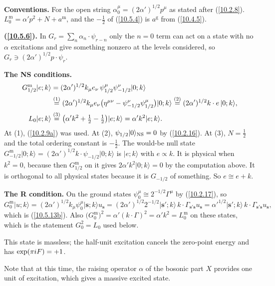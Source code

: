 	\begin{tcolorbox}[breakable]
		\begin{remark}
			\textbf{Conventions.} For the open string $\alpha^\mu_0=(2\alpha')^{1/2}p^\mu$ as stated after (\ref{10.2.8}). $L^{\mathrm m}_0=\alpha'p^{2}+N+a^{\mathrm m}$, and the $-\tfrac12$ of (\ref{10.5.4}) is $a^{\mathrm g}$ from (\ref{10.4.5}).

			\textbf{(\ref{10.5.6}).} In $G_r=\sum_n\alpha_n\cdot\psi_{r-n}$ only the $n=0$ term can act on a state with no $\alpha$ excitations and give something nonzero at the levels considered, so $G_r\ni(2\alpha')^{1/2}p\cdot\psi_r$.

			\textbf{The NS conditions.}
			\begin{align*}
				G^{\mathrm m}_{1/2}\lvert e;k\rangle&=(2\alpha')^{1/2}k_\mu e_\nu\,\psi^\mu_{1/2}\psi^\nu_{-1/2}\lvert0;k\rangle\\
				&\overset{(1)}{=}(2\alpha')^{1/2}k_\mu e_\nu\bigl(\eta^{\mu\nu}-\psi^\nu_{-1/2}\psi^\mu_{1/2}\bigr)\lvert0;k\rangle
				\overset{(2)}{=}(2\alpha')^{1/2}k\cdot e\,\lvert0;k\rangle,\\
				L_0\lvert e;k\rangle&\overset{(3)}{=}\bigl(\alpha'k^{2}+\tfrac12-\tfrac12\bigr)\lvert e;k\rangle=\alpha'k^{2}\lvert e;k\rangle .
			\end{align*}
			At (1), (\ref{10.2.9a}) was used. At (2), $\psi_{1/2}\lvert0\rangle_{\rm NS}=0$ by (\ref{10.2.16}). At (3), $N=\tfrac12$ and the total ordering constant is $-\tfrac12$. The would-be null state $G^{\mathrm m}_{-1/2}\lvert0;k\rangle=(2\alpha')^{1/2}k\cdot\psi_{-1/2}\lvert0;k\rangle$ is $\lvert e;k\rangle$ with $e\propto k$. It is physical when $k^{2}=0$, because then $G^{\mathrm m}_{1/2}$ on it gives $2\alpha'k^{2}\lvert0;k\rangle=0$ by the computation above. It is orthogonal to all physical states because it is $G_{-1/2}$ of something. So $e\cong e+k$.

			\textbf{The R condition.} On the ground states $\psi_0^\mu\cong2^{-1/2}\Gamma^\mu$ by (\ref{10.2.17}), so
			\begin{equation*}
				G^{\mathrm m}_0\lvert u;k\rangle=(2\alpha')^{1/2}k_\mu\psi^\mu_0\lvert\mathbf s;k\rangle u_{\mathbf s}=(2\alpha')^{1/2}2^{-1/2}\lvert\mathbf s';k\rangle\,k\cdot\Gamma_{\mathbf s'\mathbf s}u_{\mathbf s}=\alpha'^{1/2}\lvert\mathbf s';k\rangle\,k\cdot\Gamma_{\mathbf s'\mathbf s}u_{\mathbf s},
			\end{equation*}
			which is (\ref{10.5.13b}). Also $\bigl(G^{\mathrm m}_0\bigr)^{2}=\alpha'(k\cdot\Gamma)^{2}=\alpha'k^{2}=L^{\mathrm m}_0$ on these states, which is the statement $G_0^{2}=L_0$ used below.
		\end{remark}
	\end{tcolorbox}
	This state is massless; the half-unit excitation cancels the zero-point energy and has $\exp(\pi i F)=+1$. 
	\begin{tcolorbox}[breakable]
		Note that at this time, the raising operator $\alpha$ of the bosonic part $X$ provides one unit of excitation, which gives a massive excited state.
	\end{tcolorbox}
	
